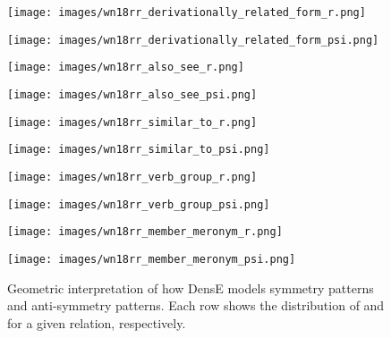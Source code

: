 \documentclass[11pt]{article}
\begin{document}
\begin{figure*}[htbp]
\centering
\begin{minipage}{6cm}
\centering
\texttt{[image: images/wn18rr\_derivationally\_related\_form\_r.png]}
\subcaption{\tiny{}}
\end{minipage}
\begin{minipage}{6cm}
\centering
\texttt{[image: images/wn18rr\_derivationally\_related\_form\_psi.png]}
\subcaption{\tiny{}}
\end{minipage}


\begin{minipage}{6cm}
\centering
\texttt{[image: images/wn18rr\_also\_see\_r.png]}
\subcaption{\tiny{}}
\end{minipage}\begin{minipage}{6cm}
\centering
\texttt{[image: images/wn18rr\_also\_see\_psi.png]}
\subcaption{\tiny{}}
\end{minipage}


\begin{minipage}{6cm}
\centering
\texttt{[image: images/wn18rr\_similar\_to\_r.png]}
\subcaption{\tiny{}}
\end{minipage}\begin{minipage}{6cm}
\centering
\texttt{[image: images/wn18rr\_similar\_to\_psi.png]}
\subcaption{\tiny{}}
\end{minipage}


\begin{minipage}{6cm}
\centering
\texttt{[image: images/wn18rr\_verb\_group\_r.png]}
\subcaption{\tiny{}}
\end{minipage}\begin{minipage}{6cm}
\centering
\texttt{[image: images/wn18rr\_verb\_group\_psi.png]}
\subcaption{\tiny{}}
\end{minipage}


\begin{minipage}{6cm}
\centering
\texttt{[image: images/wn18rr\_member\_meronym\_r.png]}
\subcaption{\tiny{}}
\end{minipage}\begin{minipage}{6cm}
\centering
\texttt{[image: images/wn18rr\_member\_meronym\_psi.png]}
\subcaption{\tiny{}}
\end{minipage}
\caption{Geometric interpretation of how DensE models symmetry patterns and anti-symmetry patterns. Each row shows the distribution of  and  for a given relation, respectively.}
\label{symmetric plots}
\end{figure*}
\end{document}
